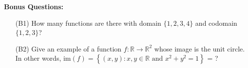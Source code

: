 \documentclass{article}
\begin{document}
    \newpage
    \textbf{Bonus Questions:}
    
    \begin{itemize}

        \item [(B1)] How many functions are there with domain $\{ 1, 2, 3, 4 \}$ and codomain $\{ 1, 2, 3 \}$?

        \item [(B2)] Give an example of a function $f : \mathbb{R} \rightarrow \mathbb{R}^2$ whose image is the unit circle.  In other words, $\mathrm{im}(f) = \left\{ (x,y) : x, y \in \mathbb{R} \text{ and } x^2 + y^2 = 1 \right\}$ = ?
    \end{itemize}
\end{document}
